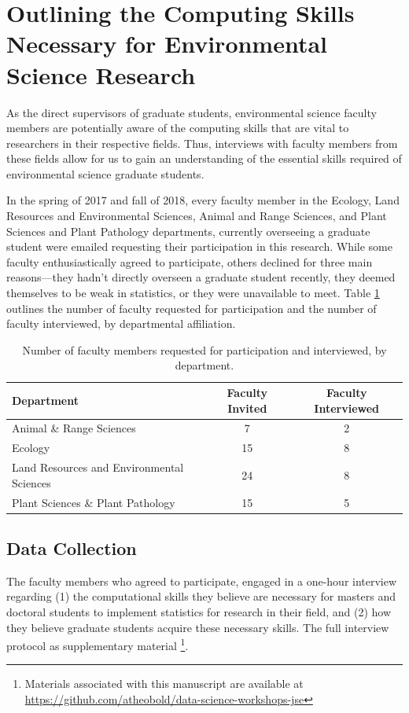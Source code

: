 \documentclass[12pt]{article}
\begin{document}
\section{Outlining the Computing Skills Necessary for Environmental Science
Research}
\label{sec:faculty}

\quad As the direct supervisors of graduate students, environmental science
faculty members are potentially aware of the computing skills that are vital to
researchers in their respective fields. Thus, interviews with faculty members
from these fields allow for us to gain an understanding of the essential skills
required of environmental science graduate students. 

\quad In the spring of 2017 and fall of 2018, every faculty member in the
Ecology, Land Resources and Environmental Sciences, Animal and Range Sciences, 
and Plant Sciences and Plant Pathology departments, currently overseeing a
graduate student were emailed requesting their participation in this research. 
While some faculty enthusiastically agreed to participate, others declined for
three main reasons---they hadn't directly overseen a graduate student recently,
they deemed themselves to be weak in statistics, or they were unavailable to
meet. Table \ref{tab:faculty} outlines the number of faculty requested for
participation and the number of faculty interviewed, by departmental
affiliation. 

{
\begin{table}[h!]
\centering
\begin{tabular}{lcc}
\hline
Department & Faculty Invited & Faculty Interviewed  \\
\hline
Animal \& Range Sciences & 7 & 2 \\
Ecology & 15 & 8 \\
Land Resources and Environmental Sciences & 24 & 8 \\
Plant Sciences \& Plant Pathology &  15 & 5 \\ 
\hline
\end{tabular}
\caption{Number of faculty members requested for participation and interviewed,
by department.}
\label{tab:faculty}
\end{table}
}

\subsection{Data Collection}  

\quad The faculty members who agreed to participate, engaged in a one-hour 
interview regarding (1) the computational skills they believe are necessary for
masters and doctoral students to implement statistics for research in their
field, and (2) how they believe graduate students acquire these necessary
skills. The full interview protocol as supplementary material 
\footnote{Materials associated with this manuscript are available at 
\href{https://github.com/atheobold/data-science-workshops-jse}{https://github.com/atheobold/data-science-workshops-jse}}.  
\end{document}
